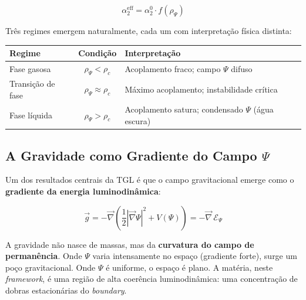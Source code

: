 \documentclass[12pt,a4paper,twoside]{article}
\newcommand{\Psifield}{\Psi}
\newcommand{\boundary}{\textit{boundary}}
\begin{document}
\begin{equation}
\alpha_2^{\text{eff}} = \alpha_2^{0} \cdot f(\rho_\Psifield)
\label{eq:eff_coupling}
\end{equation}

Tr\^es regimes emergem naturalmente, cada um com interpreta\c{c}\~ao f\'isica distinta:

\begin{center}
\begin{tabular}{lcl}
\toprule
\textbf{Regime} & \textbf{Condi\c{c}\~ao} & \textbf{Interpreta\c{c}\~ao} \\
\midrule
Fase gasosa & $\rho_\Psifield < \rho_c$ & Acoplamento fraco; campo $\Psifield$ difuso \\
Transi\c{c}\~ao de fase & $\rho_\Psifield \approx \rho_c$ & M\'aximo acoplamento; instabilidade cr\'itica \\
Fase l\'iquida & $\rho_\Psifield > \rho_c$ & Acoplamento satura; condensado $\Psifield$ (\'agua escura) \\
\bottomrule
\end{tabular}
\end{center}



\subsection{A Gravidade como Gradiente do Campo $\Psifield$}

Um dos resultados centrais da TGL \'e que o campo gravitacional emerge como o \textbf{gradiente da energia luminodin\^amica}:

\begin{equationbox}[title={Gravidade Luminodin\^amica / Luminodynamic Gravity}]
\begin{equation}
\boxed{\vec{g} = -\vec{\nabla}\!\left(\frac{1}{2}\left|\vec{\nabla}\Psifield\right|^2 + V(\Psifield)\right) = -\vec{\nabla}\,\mathcal{E}_\Psifield}
\label{eq:gravity_gradient}
\end{equation}
\end{equationbox}

\noindent A gravidade n\~ao nasce de massas, mas da \textbf{curvatura do campo de perman\^encia}. Onde $\Psifield$ varia intensamente no espa\c{c}o (gradiente forte), surge um po\c{c}o gravitacional. Onde $\Psifield$ \'e uniforme, o espa\c{c}o \'e plano. A mat\'eria, neste \textit{framework}, \'e uma regi\~ao de alta coer\^encia luminodin\^amica: uma concentra\c{c}\~ao de dobras estacion\'arias do \boundary.
\end{document}
